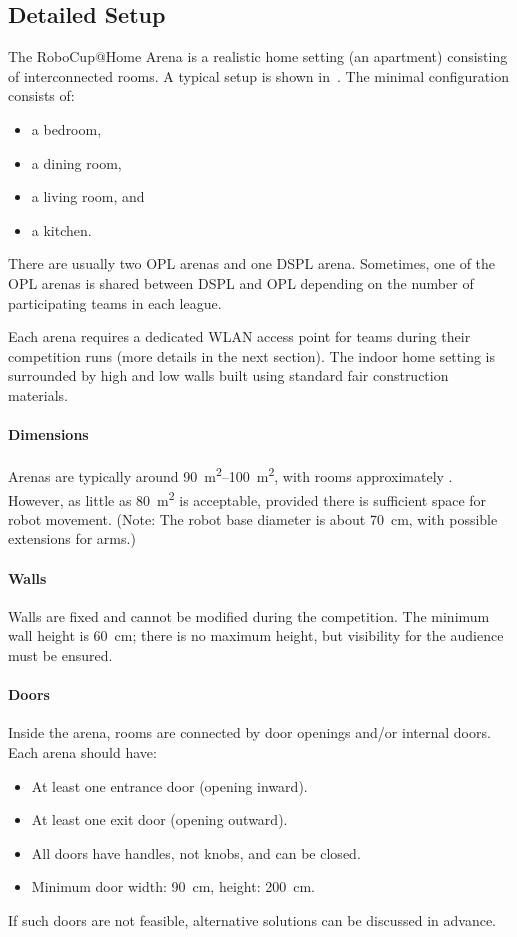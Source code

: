 \subsection{Detailed Setup}
The RoboCup@Home Arena is a realistic home setting (an apartment) consisting of interconnected rooms. A typical \Arena{} setup is shown in~. The minimal configuration consists of:
\begin{itemize}
    \item a bedroom,
    \item a dining room,
    \item a living room, and
    \item a kitchen.
\end{itemize}

There are usually two OPL arenas and one DSPL arena. Sometimes, one of the OPL arenas is shared between DSPL and OPL depending on the number of participating teams in each league.

Each arena requires a dedicated WLAN access point for teams during their competition runs (more details in the next section). The indoor home setting is surrounded by high and low walls built using standard fair construction materials.

\paragraph{Dimensions} Arenas are typically around \qtyrange{90}{100}{\metre\squared}, with rooms approximately . However, as little as \qty{80}{\metre\squared} is acceptable, provided there is sufficient space for robot movement. (Note: The robot base diameter is about \qty{70}{\centi\metre}, with possible extensions for arms.)

\paragraph{Walls} Walls are fixed and cannot be modified during the competition. The minimum wall height is \qty{60}{\centi\metre}; there is no maximum height, but visibility for the audience must be ensured.

\paragraph{Doors} Inside the arena, rooms are connected by door openings and/or internal doors. Each arena should have:
\begin{itemize}
    \item At least one entrance door (opening inward).
    \item At least one exit door (opening outward).
    \item All doors have handles, not knobs, and can be closed.
    \item Minimum door width: \qty{90}{\centi\metre}, height: \qty{200}{\centi\metre}.
\end{itemize}
If such doors are not feasible, alternative solutions can be discussed in advance.

